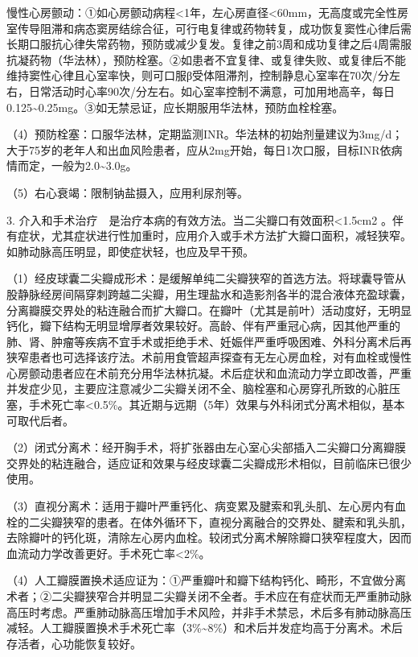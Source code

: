 慢性心房颤动：①如心房颤动病程\textless{}1年，左心房直径\textless{}60mm，无高度或完全性房室传导阻滞和病态窦房结综合征，可行电复律或药物转复，成功恢复窦性心律后需长期口服抗心律失常药物，预防或减少复发。复律之前3周和成功复律之后4周需服抗凝药物（华法林），预防栓塞。②如患者不宜复律、或复律失败、或复律后不能维持窦性心律且心室率快，则可口服β受体阻滞剂，控制静息心室率在70次/分左右，日常活动时心率90次/分左右。如心室率控制不满意，可加用地高辛，每日0.125\textasciitilde{}0.25mg。③如无禁忌证，应长期服用华法林，预防血栓栓塞。

（4）预防栓塞：口服华法林，定期监测INR。华法林的初始剂量建议为3mg/d；大于75岁的老年人和出血风险患者，应从2mg开始，每日1次口服，目标INR依病情而定，一般为2.0\textasciitilde{}3.0g。

（5）右心衰竭：限制钠盐摄入，应用利尿剂等。

3.
介入和手术治疗　是治疗本病的有效方法。当二尖瓣口有效面积\textless{}1.5cm{2}
。伴有症状，尤其症状进行性加重时，应用介入或手术方法扩大瓣口面积，减轻狭窄。如肺动脉高压明显，即使症状轻，也应及早干预。

（1）经皮球囊二尖瓣成形术：是缓解单纯二尖瓣狭窄的首选方法。将球囊导管从股静脉经房间隔穿刺跨越二尖瓣，用生理盐水和造影剂各半的混合液体充盈球囊，分离瓣膜交界处的粘连融合而扩大瓣口。在瓣叶（尤其是前叶）活动度好，无明显钙化，瓣下结构无明显增厚者效果较好。高龄、伴有严重冠心病，因其他严重的肺、肾、肿瘤等疾病不宜手术或拒绝手术、妊娠伴严重呼吸困难、外科分离术后再狭窄患者也可选择该疗法。术前用食管超声探查有无左心房血栓，对有血栓或慢性心房颤动患者应在术前充分用华法林抗凝。术后症状和血流动力学立即改善，严重并发症少见，主要应注意减少二尖瓣关闭不全、脑栓塞和心房穿孔所致的心脏压塞，手术死亡率\textless{}0.5\%。其近期与远期（5年）效果与外科闭式分离术相似，基本可取代后者。

（2）闭式分离术：经开胸手术，将扩张器由左心室心尖部插入二尖瓣口分离瓣膜交界处的粘连融合，适应证和效果与经皮球囊二尖瓣成形术相似，目前临床已很少使用。

（3）直视分离术：适用于瓣叶严重钙化、病变累及腱索和乳头肌、左心房内有血栓的二尖瓣狭窄的患者。在体外循环下，直视分离融合的交界处、腱索和乳头肌，去除瓣叶的钙化斑，清除左心房内血栓。较闭式分离术解除瓣口狭窄程度大，因而血流动力学改善更好。手术死亡率\textless{}2\%。

（4）人工瓣膜置换术适应证为：①严重瓣叶和瓣下结构钙化、畸形，不宜做分离术者；②二尖瓣狭窄合并明显二尖瓣关闭不全者。手术应在有症状而无严重肺动脉高压时考虑。严重肺动脉高压增加手术风险，并非手术禁忌，术后多有肺动脉高压减轻。人工瓣膜置换术手术死亡率（3\%\textasciitilde{}8\%）和术后并发症均高于分离术。术后存活者，心功能恢复较好。

